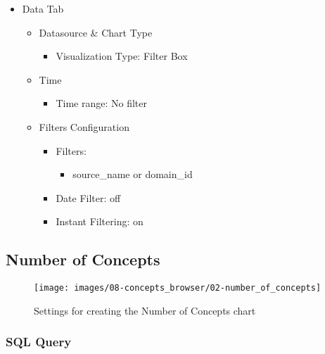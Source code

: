 \documentclass[
]{book}
\providecommand{\tightlist}{%
  \setlength{\itemsep}{0pt}\setlength{\parskip}{0pt}}
\begin{document}
\begin{itemize}
\tightlist
\item
  Data Tab

  \begin{itemize}
  \tightlist
  \item
    Datasource \& Chart Type

    \begin{itemize}
    \tightlist
    \item
      Visualization Type: Filter Box
    \end{itemize}
  \item
    Time

    \begin{itemize}
    \tightlist
    \item
      Time range: No filter
    \end{itemize}
  \item
    Filters Configuration

    \begin{itemize}
    \tightlist
    \item
      Filters:

      \begin{itemize}
      \tightlist
      \item
        source\_name or domain\_id
      \end{itemize}
    \item
      Date Filter: off
    \item
      Instant Filtering: on
    \end{itemize}
  \end{itemize}
\end{itemize}

\hypertarget{number-of-concepts}{%
\subsection*{Number of Concepts}\label{number-of-concepts}}

\begin{figure}
\texttt{[image: images/08-concepts\_browser/02-number\_of\_concepts]} \caption{Settings for creating the Number of Concepts chart}\label{fig:numOfConcepts}
\end{figure}

\hypertarget{sql-query-22}{%
\subsubsection*{SQL Query}\label{sql-query-22}}
\end{document}
